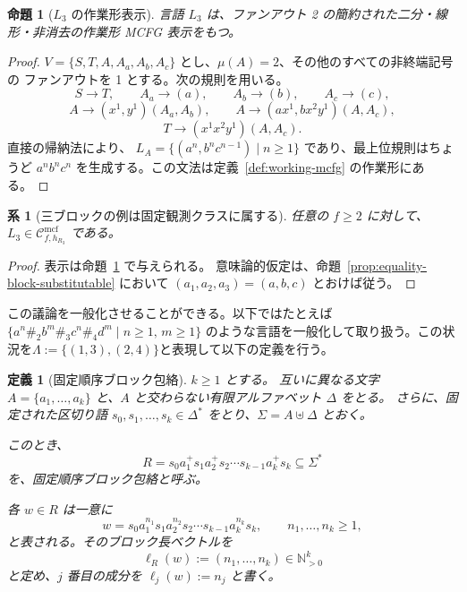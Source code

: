 \documentclass[11pt,a4paper]{ltjsarticle}
\newtheorem{proposition}[theorem]{命題}
\newtheorem{corollary}[theorem]{系}
\newtheorem{definition}[theorem]{定義}
\theoremstyle{remark}
\newcommand{\Cmcf}[2]{\mathcal{C}^{\mathrm{mcf}}_{#1,#2}}
\begin{document}
\begin{proposition}[\(L_3\) の作業形表示]
\label{prop:l3-running-example}
言語 \(L_3\) は、ファンアウト 2 の簡約された二分・線形・非消去の作業形 MCFG 表示をもつ。
\end{proposition}

\begin{proof}
\(V=\{S,T,A,A_a,A_b,A_c\}\) とし、\(\mu(A)=2\)、その他のすべての非終端記号の
ファンアウトを 1 とする。次の規則を用いる。
\[
  S\to T,\qquad A_a\to(a),\qquad A_b\to(b),\qquad A_c\to(c),
\]
\[
  A\to(x^1,y^1)(A_a,A_b),\qquad
  A\to(a x^1,b x^2 y^1)(A,A_c),
\]
\[
  T\to(x^1x^2y^1)(A,A_c).
\]
直接の帰納法により、
\(L_A=\{(a^n,b^n c^{n-1})\mid n\ge1\}\) であり、最上位規則はちょうど
\(a^n b^n c^n\) を生成する。この文法は定義~\ref{def:working-mcfg} の作業形にある。
\end{proof}

\begin{corollary}[三ブロックの例は固定観測クラスに属する]
\label{cor:l3-in-fixed-observation-class}
任意の \(f\ge2\) に対して、\(L_3\in\Cmcf{f}{h_{R_3}}\) である。
\end{corollary}

\begin{proof}
表示は命題~\ref{prop:l3-running-example} で与えられる。
意味論的仮定は、命題~\ref{prop:equality-block-substitutable} において
\((a_1,a_2,a_3)=(a,b,c)\) とおけば従う。
\end{proof}

この議論を一般化させることができる。以下ではたとえば \(\{a^n\#_2b^m\#_3c^n\#_4d^m\mid n\ge1,\, m\ge1\}\) のような言語を一般化して取り扱う。この状況を$\Lambda:=\{(1,3),(2,4)\}$と表現して以下の定義を行う。

\begin{definition}[固定順序ブロック包絡]
\label{def:fixed-ordered-block-envelope}
\(k\ge 1\) とする。
互いに異なる文字 \(A=\{a_1,\ldots,a_k\}\)
と、\(A\) と交わらない有限アルファベット \(\Delta\) をとる。
さらに、固定された区切り語 \(s_0,s_1,\ldots,s_k\in\Delta^*\)
をとり、\(\Sigma=A\uplus\Delta\)
とおく。

このとき、
\[
  R
  =
  s_0a_1^+s_1a_2^+s_2\cdots s_{k-1}a_k^+s_k
  \subseteq\Sigma^*
\]
を、\emph{固定順序ブロック包絡}と呼ぶ。

各 \(w\in R\) は一意に
\[
  w
  =
  s_0a_1^{n_1}s_1a_2^{n_2}s_2
  \cdots
  s_{k-1}a_k^{n_k}s_k,
  \qquad
  n_1,\ldots,n_k\ge1,
\]
と表される。そのブロック長ベクトルを
\[
  \ell_R(w)
  :=
  (n_1,\ldots,n_k)
  \in\mathbb{N}_{>0}^k
\]
と定め、\(j\) 番目の成分を \(\ell_j(w):=n_j\) と書く。
\end{definition}
\end{document}
